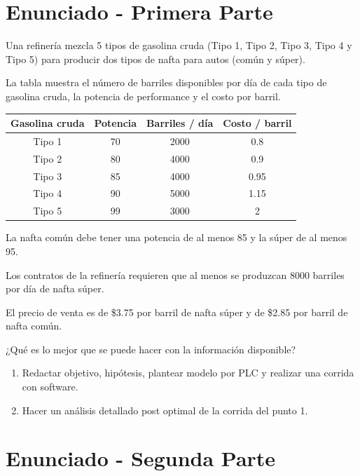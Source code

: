 \documentclass[
]{article}
\author{}
\date{}
\begin{document}
\hypertarget{enunciado---primera-parte}{%
\section{Enunciado - Primera Parte}\label{enunciado---primera-parte}}

Una refinería mezcla 5 tipos de gasolina cruda (Tipo 1, Tipo 2, Tipo 3,
Tipo 4 y Tipo 5) para producir dos tipos de nafta para autos (común y
súper).

La tabla muestra el número de barriles disponibles por día de cada tipo
de gasolina cruda, la potencia de performance y el costo por barril.

\begin{longtable}[]{@{}cccc@{}}
\toprule
Gasolina cruda & Potencia & Barriles / día & Costo / barril \\
\midrule
\endhead
Tipo 1 & 70 & 2000 & 0.8 \\
Tipo 2 & 80 & 4000 & 0.9 \\
Tipo 3 & 85 & 4000 & 0.95 \\
Tipo 4 & 90 & 5000 & 1.15 \\
Tipo 5 & 99 & 3000 & 2 \\
\bottomrule
\end{longtable}

La nafta común debe tener una potencia de al menos 85 y la súper de al
menos 95.

Los contratos de la refinería requieren que al menos se produzcan 8000
barriles por día de nafta súper.

El precio de venta es de \$3.75 por barril de nafta súper y de \$2.85
por barril de nafta común.

¿Qué es lo mejor que se puede hacer con la información disponible?

\begin{enumerate}
\def\labelenumi{\arabic{enumi}.}
\item
  Redactar objetivo, hipótesis, plantear modelo por PLC y realizar una
  corrida con software.
\item
  Hacer un análisis detallado post optimal de la corrida del punto 1.
\end{enumerate}

\hypertarget{enunciado---segunda-parte}{%
\section{Enunciado - Segunda Parte}\label{enunciado---segunda-parte}}
\end{document}
